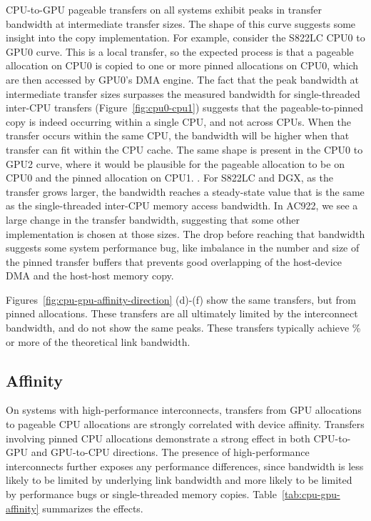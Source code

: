 CPU-to-GPU pageable transfers on all systems exhibit peaks in transfer bandwidth at intermediate transfer sizes.
The shape of this curve suggests some insight into the copy implementation.
For example, consider the S822LC CPU0 to GPU0 curve.
This is a local transfer, so the expected process is that a pageable allocation on CPU0 is copied to one or more pinned allocations on CPU0, which are then accessed by GPU0's DMA engine.
The fact that the peak bandwidth at intermediate transfer sizes surpasses the measured bandwidth for single-threaded inter-CPU transfers (Figure~\ref{fig:cpu0-cpu1}) suggests that the pageable-to-pinned copy is indeed occurring within a single CPU, and not across CPUs.
When the transfer occurs within the same CPU, the bandwidth will be higher when that transfer can fit within the CPU cache.
The same shape is present in the CPU0 to GPU2 curve, where it would be plausible for the pageable allocation to be on CPU0 and the pinned allocation on CPU1.
.
For S822LC and DGX, as the transfer grows larger, the bandwidth reaches a steady-state value that is the same as the single-threaded inter-CPU memory access bandwidth.
In AC922, we see a large change in the transfer bandwidth, suggesting that some other implementation is chosen at those sizes.
The drop before reaching that bandwidth suggests some system performance bug, like imbalance in the number and size of the pinned transfer buffers that prevents good overlapping of the host-device DMA and the host-host memory copy.

Figures~\ref{fig:cpu-gpu-affinity-direction} (d)-(f) show the same transfers, but from pinned allocations.
These transfers are all ultimately limited by the interconnect bandwidth, and do not show the same peaks.
These transfers typically achieve \% or more of the theoretical link bandwidth.

\subsection{Affinity}
\label{sec:explicit-cpu-gpu-affinity}

On systems with high-performance interconnects, transfers from GPU allocations to pageable CPU allocations are strongly correlated with device affinity.
Transfers involving pinned CPU allocations demonstrate a strong effect in both CPU-to-GPU and GPU-to-CPU directions.
The presence of high-performance interconnects further exposes any performance differences, since bandwidth is less likely to be limited by underlying link bandwidth and more likely to be limited by performance bugs or single-threaded memory copies.
Table~\ref{tab:cpu-gpu-affinity} summarizes the effects.

